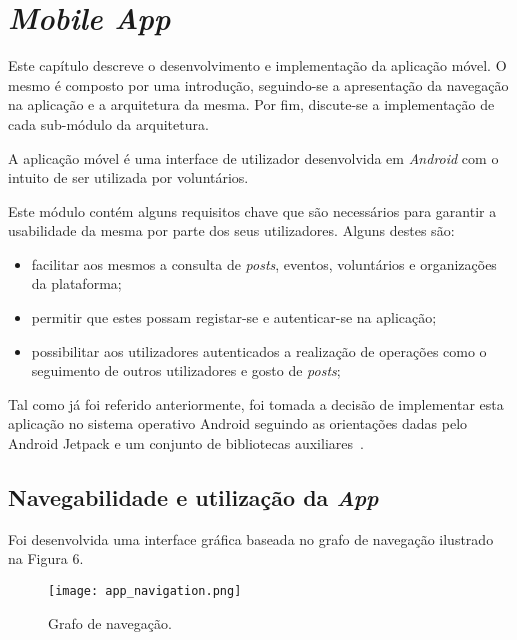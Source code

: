 \pagebreak
\hspace{0pt}
\vfill
{
	\section{\textit{Mobile App}}
	Este capítulo descreve o desenvolvimento e implementação da aplicação móvel. O mesmo é composto por uma introdução, seguindo-se a apresentação da navegação na aplicação e a arquitetura da mesma. Por fim, discute-se a implementação de cada sub-módulo da arquitetura.
	
	\par \medskip
	
	A aplicação móvel é uma interface de utilizador desenvolvida em \textit{Android} com o intuito de ser utilizada por voluntários.
	
	\par \medskip
	
	Este módulo contém alguns requisitos chave que são necessários para garantir a usabilidade da mesma por parte dos seus utilizadores. Alguns destes são:
	
	\begin{itemize}
		\item facilitar aos mesmos a consulta de \textit{posts}, eventos, voluntários e organizações da plataforma;
		\item permitir que estes possam registar-se e autenticar-se na aplicação;
		\item possibilitar aos utilizadores autenticados a realização de operações como o seguimento de outros utilizadores e gosto de \textit{posts};
	\end{itemize}
	
	\par \medskip
	
	Tal como já foi referido anteriormente, foi tomada a decisão de implementar esta aplicação no sistema operativo Android seguindo as orientações dadas pelo Android Jetpack e um conjunto de bibliotecas auxiliares~\cite{Gargenta2014}.
}
\vfill
\hspace{0pt}
\pagebreak

\subsection{Navegabilidade e utilização da \textit{App}}

Foi desenvolvida uma interface gráfica baseada no grafo de navegação ilustrado na Figura 6.

\begin{figure}[h]
	\centering
	\texttt{[image: app\_navigation.png]}
	\caption{Grafo de navegação.}
\end{figure}

